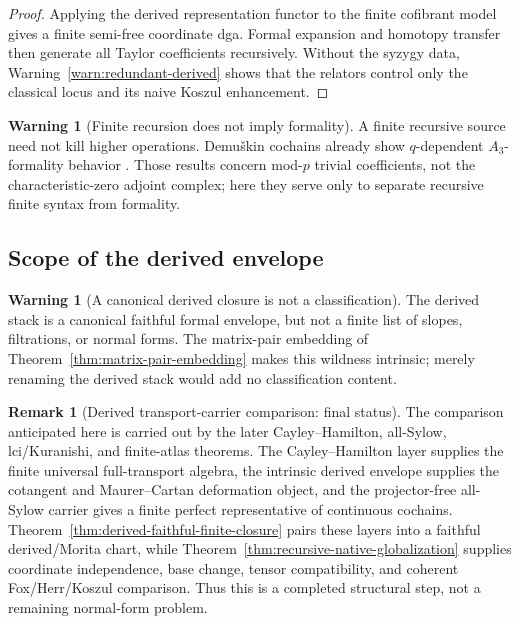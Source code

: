 \documentclass[11pt]{article}
\theoremstyle{definition}
\newtheorem{remark}[theorem]{Remark}
\newtheorem{warning}[theorem]{Warning}
\begin{document}
\begin{proof}
Applying the derived representation functor to the finite cofibrant model gives a finite semi-free coordinate dga.  Formal expansion and homotopy transfer then generate all Taylor coefficients recursively.  Without the syzygy data, Warning~\ref{warn:redundant-derived} shows that the relators control only the classical locus and its naive Koszul enhancement.
\end{proof}

\begin{warning}[Finite recursion does not imply formality]\label{warn:no-formality}
A finite recursive source need not kill higher operations.  Demu\v{s}kin cochains already show $q$-dependent $A_3$-formality behavior \cite{PalQuickOdd,PalQuickTwo}.  Those results concern mod-$p$ trivial coefficients, not the characteristic-zero adjoint complex; here they serve only to separate recursive finite syntax from formality.
\end{warning}

\subsection{Scope of the derived envelope}

\begin{warning}[A canonical derived closure is not a classification]\label{warn:derived-not-classification}
The derived stack is a canonical faithful formal envelope, but not a finite list of slopes, filtrations, or normal forms.  The matrix-pair embedding of Theorem~\ref{thm:matrix-pair-embedding} makes this wildness intrinsic; merely renaming the derived stack would add no classification content.
\end{warning}

\begin{remark}[Derived transport-carrier comparison: final status]\label{rem:derived-transport-comparison-closed}
The comparison anticipated here is carried out by the later Cayley--Hamilton, all-Sylow, lci/Kuranishi, and finite-atlas theorems.  The Cayley--Hamilton layer supplies the finite universal full-transport algebra, the intrinsic derived envelope supplies the cotangent and Maurer--Cartan deformation object, and the projector-free all-Sylow carrier gives a finite perfect representative of continuous cochains.  Theorem~\ref{thm:derived-faithful-finite-closure} pairs these layers into a faithful derived/Morita chart, while Theorem~\ref{thm:recursive-native-globalization} supplies coordinate independence, base change, tensor compatibility, and coherent Fox/Herr/Koszul comparison.  Thus this is a completed structural step, not a remaining normal-form problem.
\end{remark}
\end{document}
